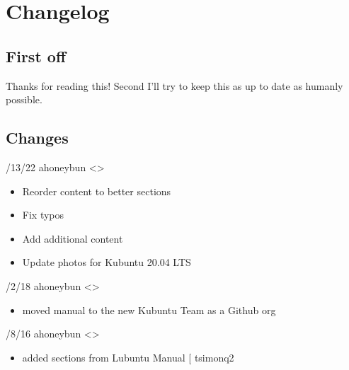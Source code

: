 \documentclass[letterpaper,10pt,english]{sphinxmanual}
\begin{document}
\section{Changelog}
\label{\detokenize{docs/appendix/changes:changelog}}\label{\detokenize{docs/appendix/changes::doc}}

\subsection{First off}
\label{\detokenize{docs/appendix/changes:first-off}}
\sphinxAtStartPar
Thanks for reading this! Second I’ll try to keep this as up to date as humanly possible.


\subsection{Changes}
\label{\detokenize{docs/appendix/changes:changes}}
/13/22 \sphinxhyphen{} ahoneybun \textless{}\textgreater{}
\begin{itemize}
\item {} 
\sphinxAtStartPar
Reorder content to better sections

\item {} 
\sphinxAtStartPar
Fix typos

\item {} 
\sphinxAtStartPar
Add additional content

\item {} 
\sphinxAtStartPar
Update photos for Kubuntu 20.04 LTS

\end{itemize}

/2/18 \sphinxhyphen{} ahoneybun \textless{}\textgreater{}
\begin{itemize}
\item {} 
\sphinxAtStartPar
moved manual to the new Kubuntu Team as a Github org

\end{itemize}

/8/16 \sphinxhyphen{} ahoneybun \textless{}\textgreater{}
\begin{itemize}
\item {} 
\sphinxAtStartPar
added sections from Lubuntu Manual {[}\sphinxurl{https://github.com/tsimonq2/lubuntu-manual}{]}
\sphinxhyphen{} tsimonq2

\end{itemize}
\end{document}
